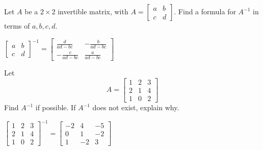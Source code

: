 \documentclass{ximera}
\begin{document}
\begin{problem}\label{prb:4.39}Let $A$ be a $2\times 2$ invertible matrix, with $A=\left[
\begin{array}{cc}
a & b \\
c & d
\end{array}
\right] .$ Find a formula for $A^{-1}$ in terms of $a,b,c,d$.
\begin{hint}
$\left[
\begin{array}{cc}
a & b \\
c & d
\end{array}
\right]^{-1}= \left[
\begin{array}{cc}
\frac{d}{ad-bc} & -\frac{b}{ad-bc} \\
-\frac{c}{ad-bc} & \frac{a}{ad-bc}
\end{array}
\right]$
\end{hint}
\end{problem}

\begin{problem}\label{prb:4.40}Let
\begin{equation*}
A=\left[
\begin{array}{rrr}
1 & 2 & 3 \\
2 & 1 & 4 \\
1 & 0 & 2
\end{array}
\right]
\end{equation*}
Find $A^{-1}$ if possible. If $A^{-1}$ does not exist, explain why.
\begin{hint}
$\left[
\begin{array}{ccc}
1 & 2 & 3 \\
2 & 1 & 4 \\
1 & 0 & 2
\end{array}
\right]^{-1}= \left[
\begin{array}{rrr}
-2 & 4 & -5 \\
0 & 1 & -2 \\
1 & -2 & 3
\end{array}
\right]$
\end{hint}
\end{problem}
\end{document}
